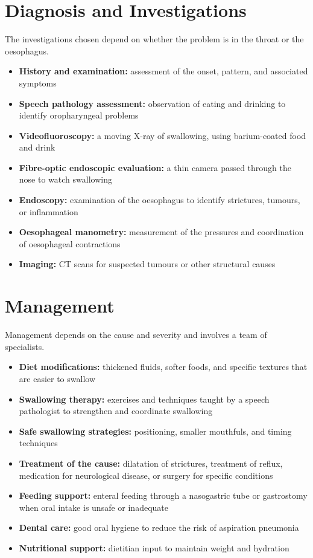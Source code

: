 \section*{Diagnosis and Investigations}
The investigations chosen depend on whether the problem is in the throat or the oesophagus.
\begin{itemize}
    \item \textbf{History and examination:} assessment of the onset, pattern, and associated symptoms
    \item \textbf{Speech pathology assessment:} observation of eating and drinking to identify oropharyngeal problems
    \item \textbf{Videofluoroscopy:} a moving X-ray of swallowing, using barium-coated food and drink
    \item \textbf{Fibre-optic endoscopic evaluation:} a thin camera passed through the nose to watch swallowing
    \item \textbf{Endoscopy:} examination of the oesophagus to identify strictures, tumours, or inflammation
    \item \textbf{Oesophageal manometry:} measurement of the pressures and coordination of oesophageal contractions
    \item \textbf{Imaging:} CT scans for suspected tumours or other structural causes
\end{itemize}

\section*{Management}
Management depends on the cause and severity and involves a team of specialists.
\begin{itemize}
    \item \textbf{Diet modifications:} thickened fluids, softer foods, and specific textures that are easier to swallow
    \item \textbf{Swallowing therapy:} exercises and techniques taught by a speech pathologist to strengthen and coordinate swallowing
    \item \textbf{Safe swallowing strategies:} positioning, smaller mouthfuls, and timing techniques
    \item \textbf{Treatment of the cause:} dilatation of strictures, treatment of reflux, medication for neurological disease, or surgery for specific conditions
    \item \textbf{Feeding support:} enteral feeding through a nasogastric tube or gastrostomy when oral intake is unsafe or inadequate
    \item \textbf{Dental care:} good oral hygiene to reduce the risk of aspiration pneumonia
    \item \textbf{Nutritional support:} dietitian input to maintain weight and hydration
\end{itemize}

